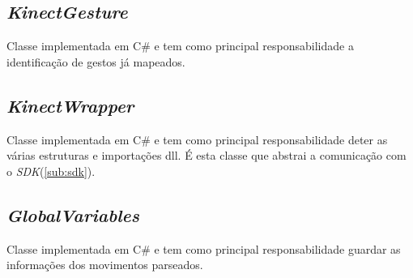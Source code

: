   \subsection{\textit{KinectGesture}}\label{sub:kgesture}
    Classe implementada em C\# e tem como principal responsabilidade a identificação de gestos já mapeados.

  \subsection{\textit{KinectWrapper}}\label{sub:kwrapper}
    Classe implementada em C\# e tem como principal responsabilidade deter as várias estruturas e importações dll. É esta classe que abstrai a comunicação com o
    \textit{SDK}(\ref{sub:sdk}).

  \subsection{\textit{GlobalVariables}}\label{sub:gvariable}
    Classe implementada em C\# e tem como principal responsabilidade guardar as informações dos movimentos parseados.


